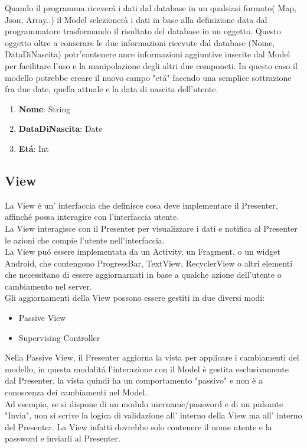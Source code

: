    Quando il programma ricever\'a i dati dal database in un qualsiasi formato( Map, Json, Array..) il Model selezionerà i dati in base alla definizione data dal programmatore trasformando il risultato del database in un oggetto.
   Questo oggetto oltre a conserare le due informazioni ricevute dal database (Nome, DataDiNascita) potr'\a contenere ance informazioni aggiuntive inserite dal Model per facilitare l'uso e la manipolazione degli altri due componeti.
   In questo caso il modello potrebbe creare il nuovo campo "et\'a" facendo una semplice sottrazione fra due date, quella attuale e la data di nascita dell'utente.

   \begin{enumerate}
   \item \textbf{Nome}: String
   \item \textbf{DataDiNascita}: Date
   \item \textbf{Et\'a}: Int
   \end{enumerate}


   \subsection{View}
   La View \'e un' interfaccia che definisce cosa deve implementare il Presenter, affinch\'e possa interagire con l'interfaccia utente.\\
   La View interagisce con il Presenter per visualizzare i dati e notifica al Presenter le azioni che compie l'utente nell'interfaccia.\\
   La View pu\'o essere implementata da un Activity, un Fragment, o un widget Android, che contengono ProgressBar, TextView, RecyclerView o altri elementi che necessitano di essere aggiornarnati in base a qualche azione dell'utente o cambiamento nel server.\\
   Gli aggiornamenti della View possono essere gestiti in due diversi modi:
   \begin{itemize}
       \item Passive View
       \item Supervising Controller
   \end{itemize}

   Nella Passive View, il Presenter aggiorna la vista per applicare i cambiamenti del modello, in questa modalit\'a l'interazione con il Model è gestita esclusivamente dal Presenter, la vista quindi ha un comportamento "passivo" e non è a conoscenza dei cambiamenti nel Model.\\
   Ad esempio, se si dispone di un modulo username/password e di un pulsante "Invia", non si scrive la logica di validazione all' interno della View ma all' interno del Presenter. La View infatti dovrebbe solo contenere il nome utente e la password e inviarli al Presenter.

